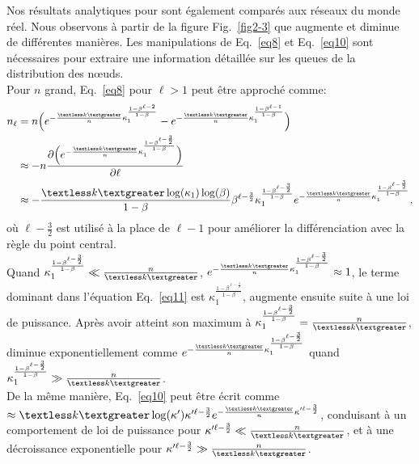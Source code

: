 Nos résultats analytiques pour \nl sont également comparés aux réseaux du monde réel. Nous observons à partir de la figure Fig.~\ref{fig2-3} que \nl augmente et diminue de différentes manières. Les manipulations de Eq.~\ref{eq8} et Eq.~\ref {eq10} sont nécessaires pour extraire une information détaillée sur les queues de la distribution des nœuds. \\ Pour $n$ grand, Eq.~\ref{eq8} pour $\ell>1$ peut être approché comme:
\begin{align}
n_{\ell}&=n\Big(e^{-\frac{\km}{n}\kappa_1^{\frac{1-\beta^{\ell-2}}{1-\beta}}}-e^{-\frac{\km}{n}\kappa_1^{\frac{1-\beta^{\ell-1}}{1-\beta}}}\Big) \nonumber \\
&\approx -n \frac{\partial \Big(e^{-\frac{\km}{n}\kappa_1^{\frac{1-\beta^{\ell-\frac{3}{2}}}{1-\beta}}} \Big) }{\partial \ell} \nonumber \\
&\approx -\frac {\km \log(\kappa_1) \log(\beta)} {1-\beta} \beta^{\ell-\frac{3}{2}} \kappa_1^{\frac{1-\beta^{\ell-\frac{3}{2}}}{1-\beta}}e^{-\frac{\km}{n}\kappa_1^{\frac{1-\beta^{\ell-\frac{3}{2}}}{1-\beta}}}, 
\label{eq11}
\end{align}
où $ \ell-\frac{3}{2} $ est utilisé à la place de $ \ell-1$ pour améliorer la différenciation avec la règle du point central. \\
Quand $\kappa_1^{\frac{1-\beta^{\ell-\frac{3}{2}}}{1-\beta}}\ll\frac{n}{\km}$,  $e^{-\frac{\km}{n}\kappa_1^{\frac{1-\beta^{\ell-\frac{3}{2}}}{1-\beta}}}\approx 1$, le terme dominant dans l'équation Eq.~\ref{eq11} est $\kappa_1^{\frac{1-\beta^{\ell-\frac{3}{2}}}{1-\beta}}$, \nl augmente ensuite suite à une loi de puissance. Après avoir atteint son maximum à $\kappa_1^{\frac{1-\beta^{\ell-\frac{3}{2}}}{1-\beta}}=\frac{n}{\km}$, \nl diminue exponentiellement comme
$e^{-\frac{\km}{n}\kappa_1^{\frac{1-\beta^{\ell-\frac{3}{2}}}{1-\beta}}}$ quand $\kappa_1^{\frac{1-\beta^{\ell-\frac{3}{2}}}{1-\beta}}\gg\frac{n}{\km}$.\\
De la même manière, Eq.~\ref{eq10} peut être écrit comme \nl$\approx \km \log(\kappa')\kappa'^{\ell-\frac{3}{2}}e^{-\frac{\km}{n}\kappa'^{\ell-\frac{3}{2}}}$, conduisant à un comportement de loi de puissance pour $\kappa'^{\ell-\frac{3}{2}} \ll \frac{n}{\km}$, et à une décroissance exponentielle pour $\kappa'^{\ell-\frac{3}{2}} \gg \frac{n}{\km}$.
